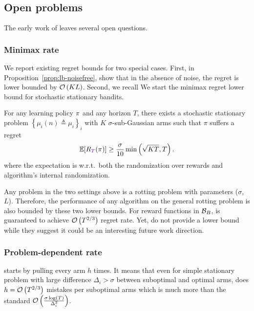 \subsection{Open problems}

The early work of \citet{levine2017rotting} leaves several open questions.

\subsubsection{Minimax rate}
We report existing regret bounds for two special cases. First, in Proposition~\ref{prop:lb-noisefree}, \citet{heidari2016tight} show that in the absence of noise, the regret is lower bounded by $\mathcal{O}\left(KL\right)$. Second, we recall  We start the minimax regret lower bound for stochastic stationary bandits.

\begin{proposition}{\cite[Thm.\,5.1]{auer2002nonstochastic}}
\label{stochastic-LB}
For any learning policy $\pi$ and any horizon $T$, there exists a stochastic stationary problem $\left\{ \mu_i (n) \triangleq \mu_i\right\}_i$ with $K$ $\sigma$-sub-Gaussian arms such that $\pi$ suffers a regret
\begin{equation*}
 \mathbb{E}[\regret(\policy)] \geq \frac{\sigma}{10}\min\pa{\sqrt{\narms\timeEnd},\timeEnd}.
\end{equation*}
where the expectation is w.r.t.\ both the randomization
over rewards and algorithm's internal randomization.
\end{proposition}

Any problem in the two settings above is a rotting problem with parameters ($\sigma$, $L$). Therefore, the performance of any algorithm on the general rotting problem is also bounded by these two lower bounds. For reward functions in $\mathcal{B}_{B}$, \SWA is guaranteed to achieve $\mathcal{O}\left(T^{2/3}\right)$ regret rate. Yet, \citet{levine2017rotting} do not provide a lower bound while they suggest it could be an interesting future work direction.

\subsubsection{Problem-dependent rate}
\SWA starts by pulling every arm $h$ times. It means that even for simple stationary problem with large difference $\Delta_i > \sigma$ between suboptimal and optimal arms, \SWA does $h = \mathcal{O}\left(T^{2/3}\right)$ mistakes per suboptimal arms which is much more than the standard $\mathcal{O}\left(\frac{\sigma\log\left(T\right)}{\Delta_i^2}\right)$.

